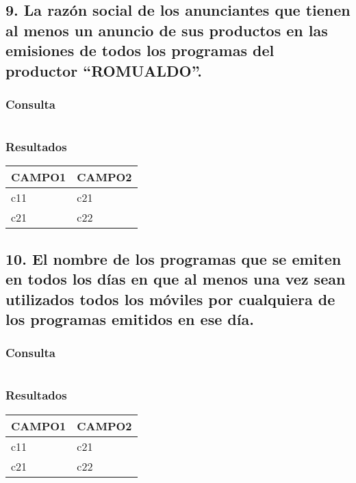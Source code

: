 \subsection*{9. \normalsize{La raz\'on social de los anunciantes que tienen al menos un anuncio de sus productos en las emisiones de todos los programas del productor ``ROMUALDO''.}}

\subsubsection*{Consulta}
\begin{lstlisting} 

\end{lstlisting}

\subsubsection*{Resultados}
\begin{tabular}{|l|l|}
  \hline
    \bf{CAMPO1} & \bf{CAMPO2} \\ 
  \hline
    c11 & c21 \\ 
    c21 & c22 \\
  \hline
\end{tabular} 

\subsection*{10. \normalsize{El nombre de los programas que se emiten en todos los d\'ias en que al menos una vez sean utilizados todos los m\'oviles por cualquiera de los programas emitidos en ese d\'ia.}}

\subsubsection*{Consulta}
\begin{lstlisting} 

\end{lstlisting}

\subsubsection*{Resultados}
\begin{tabular}{|l|l|}
  \hline
    \bf{CAMPO1} & \bf{CAMPO2} \\ 
  \hline
    c11 & c21 \\ 
    c21 & c22 \\
  \hline
\end{tabular} 
